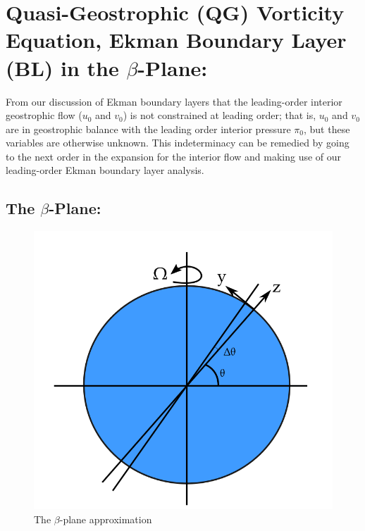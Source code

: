 \documentclass{article}
\begin{document}
\section{Quasi-Geostrophic (QG) Vorticity Equation, Ekman Boundary Layer (BL) in the $\beta$-Plane:}
From our discussion of Ekman boundary layers that the leading-order interior geostrophic flow ($u_{0}$ and $v_{0}$) is not constrained at leading order; that is, $u_{0}$ and $v_{0}$ are in geostrophic balance with the leading order interior pressure $\pi_{0}$, but these variables are otherwise unknown. This indeterminacy can be remedied by going to the next order in the expansion for the interior flow and making use of our leading-order Ekman boundary layer analysis.
\subsection{The $\beta$-Plane:}
\begin{figure}[H]
    \centering
    \includegraphics[scale = 0.3]{Figs/beta_plane.png}
    \caption{The $\beta$-plane approximation}
    \label{fig:beta_plane}
\end{figure}
\end{document}
